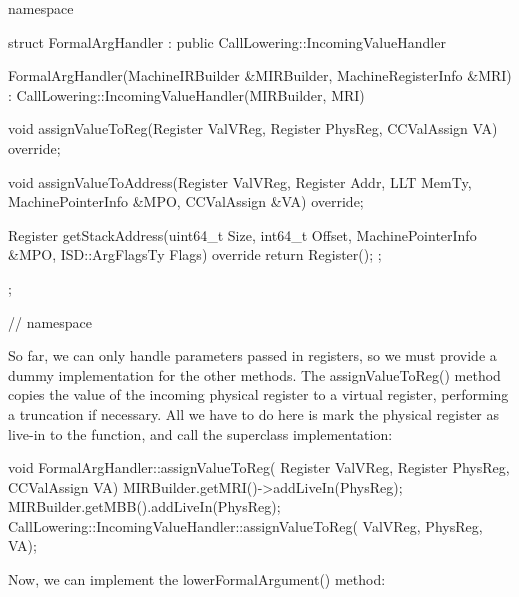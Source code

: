 \begin{cpp}
namespace {
struct FormalArgHandler
        : public CallLowering::IncomingValueHandler {
    FormalArgHandler(MachineIRBuilder &MIRBuilder,
                     MachineRegisterInfo &MRI)
        : CallLowering::IncomingValueHandler(MIRBuilder,
                                             MRI) {}

    void assignValueToReg(Register ValVReg,
                          Register PhysReg,
                          CCValAssign VA) override;

    void assignValueToAddress(Register ValVReg,
                              Register Addr, LLT MemTy,
                              MachinePointerInfo &MPO,
                              CCValAssign &VA) override{};

    Register
    getStackAddress(uint64_t Size, int64_t Offset,
                    MachinePointerInfo &MPO,
                    ISD::ArgFlagsTy Flags) override {
        return Register();
    };
};
} // namespace
\end{cpp}

So far, we can only handle parameters passed in registers, so we must provide a dummy implementation for the other methods. The assignValueToReg() method copies the value of the incoming physical register to a virtual register, performing a truncation if necessary. All we have to do here is mark the physical register as live-in to the function, and call the superclass implementation:

\begin{cpp}
void FormalArgHandler::assignValueToReg(
        Register ValVReg, Register PhysReg,
        CCValAssign VA) {
    MIRBuilder.getMRI()->addLiveIn(PhysReg);
    MIRBuilder.getMBB().addLiveIn(PhysReg);
    CallLowering::IncomingValueHandler::assignValueToReg(
        ValVReg, PhysReg, VA);
}
\end{cpp}

Now, we can implement the lowerFormalArgument() method:

